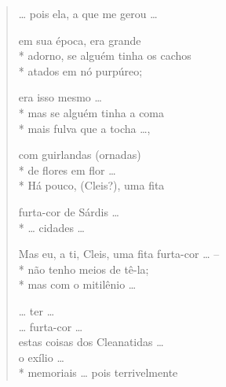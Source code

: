 \pagebreak

\begin{verse}
\ldots{} pois ela, a que me gerou \ldots{}


em sua época, era grande \\*
adorno, se alguém tinha os cachos\\*
atados em nó purpúreo;


era isso mesmo \ldots{} \\*
mas se alguém tinha a coma\\*
mais fulva que a tocha \ldots{},

com guirlandas (ornadas)\\*
de flores em flor \ldots{}\\*
Há pouco, (Cleis?), uma fita

furta-cor de Sárdis \ldots{}\\*
\ldots{} cidades \ldots{}

Mas eu, a ti, Cleis, uma fita furta-cor \ldots{} --\\*
não tenho meios de tê-la; \\*
mas com o mitilênio \ldots{}

\ast\quad\ast\quad\ast

\ldots{} ter \ldots{}\\
\ldots{} furta-cor \ldots{}\\
estas coisas dos Cleanatidas \ldots{}\\
o exílio \ldots{}\\*
memoriais \ldots{} pois terrivelmente 
\end{verse}

\pagebreak

